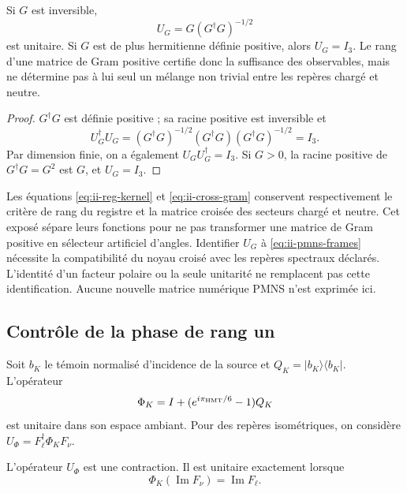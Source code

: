\begin{proposition}
Si \(G\) est inversible,
\begin{equation}
 U_G=G(G^\dagger G)^{-1/2}
 \label{eq:ii-polar}
\end{equation}
est unitaire. Si \(G\) est de plus hermitienne définie positive, alors
\(U_G=I_3\). Le rang d'une matrice de Gram positive certifie donc
la suffisance des observables, mais ne détermine pas à lui seul un
mélange non trivial entre les repères chargé et neutre.
\end{proposition}

\begin{proof}
\(G^\dagger G\) est définie positive ; sa racine positive est inversible et
\[
 U_G^\dagger U_G=(G^\dagger G)^{-1/2}(G^\dagger G)
 (G^\dagger G)^{-1/2}=I_3.
\]
Par dimension finie, on a également
\(U_GU_G^\dagger=I_3\). Si \(G>0\), la racine positive de
\(G^\dagger G=G^2\) est \(G\), et \(U_G=I_3\).
\end{proof}

\begin{remark}
Les équations \eqref{eq:ii-reg-kernel} et \eqref{eq:ii-cross-gram}
conservent respectivement le critère de rang du registre et
la matrice croisée des secteurs chargé et neutre. Cet exposé
sépare leurs fonctions pour ne pas transformer une matrice de Gram positive en sélecteur
artificiel d’angles. Identifier \(U_G\) à
\eqref{eq:ii-pmns-frames} nécessite la compatibilité du noyau croisé
avec les repères spectraux déclarés. L’identité d’un facteur polaire
ou la seule unitarité ne remplacent pas cette identification. Aucune
nouvelle matrice numérique PMNS n’est exprimée ici.
\end{remark}

\subsection{Contrôle de la phase de rang un}

Soit \(b_K\) le témoin normalisé d'incidence de la source et
\(Q_K=|b_K\rangle\langle b_K|\). L'opérateur
\begin{equation}
 \Phi_K=I+(e^{i\pi_{\rm HMT}/6}-1)Q_K
 \label{eq:ii-rank-one-phase}
\end{equation}
est unitaire dans son espace ambiant. Pour des repères isométriques, on considère
\(U_\Phi=F_\ell^\dagger\Phi_KF_\nu\).

\begin{proposition}
L'opérateur \(U_\Phi\) est une contraction. Il est unitaire exactement
lorsque
\begin{equation}
 \Phi_K(\operatorname{Im}F_\nu)=\operatorname{Im}F_\ell.
 \label{eq:ii-phase-compatibility}
\end{equation}
\end{proposition}

